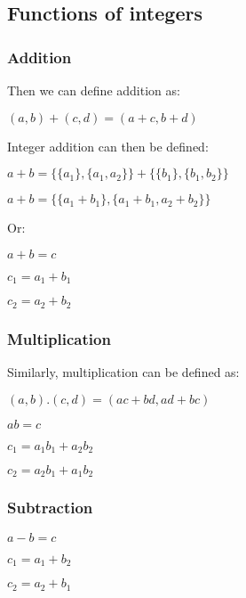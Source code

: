 \subsection{Functions of integers}

\subsubsection{Addition}

Then we can define addition as:

\((a,b)+(c,d)=(a+c,b+d)\)

Integer addition can then be defined:

\(a+b=\{\{a_1\},\{a_1,a_2\}\}+\{\{b_1\},\{b_1,b_2\}\}\)

\(a+b=\{\{a_1+b_1\},\{a_1+b_1,a_2+b_2\}\}\)

Or:

\(a+b=c\)

\(c_1=a_1+b_1\)

\(c_2=a_2+b_2\)

\subsubsection{Multiplication}

Similarly, multiplication can be defined as:

\((a,b).(c,d)=(ac+bd, ad+bc)\)

\(ab=c\)

\(c_1=a_1b_1+a_2b_2\)

\(c_2=a_2b_1+a_1b_2\)

\subsubsection{Subtraction}

\(a-b=c\)

\(c_1=a_1+b_2\)

\(c_2=a_2+b_1\)

